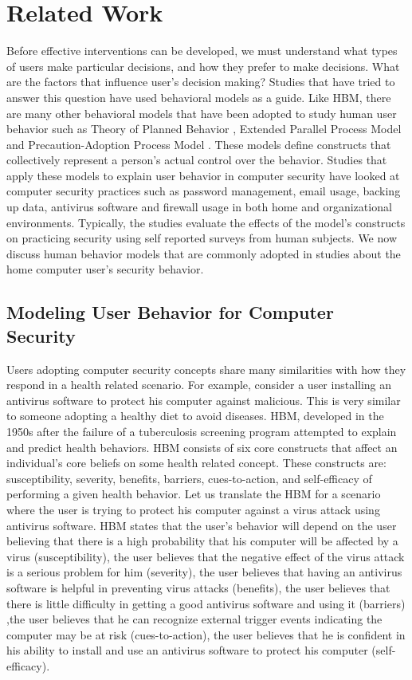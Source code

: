 \section{Related Work}
Before effective interventions can be developed, we must understand what types of users make particular decisions, and how they prefer to make decisions. 
What are the factors that influence user's decision making? 
Studies that have tried to answer this question have used behavioral models as a guide. Like HBM, there are many other behavioral models that have been adopted to study human user behavior such as Theory of Planned Behavior \cite{ajzen1991}, Extended Parallel Process Model \cite{witte1992} and Precaution-Adoption Process  Model \cite{weinstein2002}. 
These models define constructs that collectively represent a person's actual control over the behavior. 
Studies that apply these models to explain user behavior in computer security have looked at computer security practices such as password management, email usage, backing up data, antivirus software and firewall usage in both home and organizational environments. Typically, the studies evaluate the effects of the model's constructs on practicing security using self reported surveys from human subjects. 
We now discuss human behavior models that are commonly adopted in studies about the home computer user's security behavior.


\subsection{Modeling User Behavior for Computer Security}
Users adopting computer security concepts share many similarities with how they respond in a health related scenario. 
For example, consider a user installing an antivirus software to protect his computer against malicious. 
This is very similar to someone adopting a healthy diet to avoid diseases. HBM, developed in the 1950s after the failure of a tuberculosis screening program attempted to explain and predict health behaviors. HBM consists of six core constructs that affect an individual's core beliefs on some health related concept. These constructs are: susceptibility, severity, benefits, barriers, cues-to-action, and self-efficacy of performing a given health behavior. Let us translate the HBM for a scenario where the user is trying to protect his computer against a virus attack using antivirus software. HBM states that the user's behavior will depend on the user believing that there is a high probability that his computer will be affected by a virus (susceptibility), the user believes that the negative effect of the virus attack is a serious problem for him (severity), the user believes that having an antivirus software is helpful in preventing virus attacks (benefits), the user believes that there is little difficulty in getting a good antivirus software and using it (barriers) ,the user believes that he can recognize external trigger events indicating the computer may be at risk (cues-to-action), the user believes that he is confident in his ability to install and use an antivirus software to protect his computer (self-efficacy).

